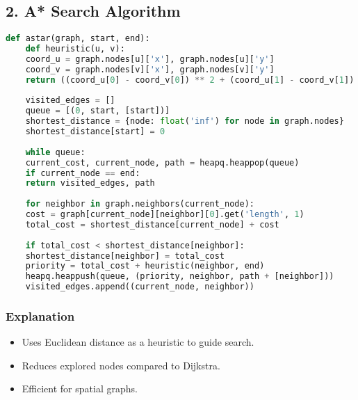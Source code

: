 \subsection*{2. A* Search Algorithm}
\begin{lstlisting}[language=Python, caption=A* Search with Heuristic]
	def astar(graph, start, end):
	def heuristic(u, v):
	coord_u = graph.nodes[u]['x'], graph.nodes[u]['y']
	coord_v = graph.nodes[v]['x'], graph.nodes[v]['y']
	return ((coord_u[0] - coord_v[0]) ** 2 + (coord_u[1] - coord_v[1]) ** 2) ** 0.5
	
	visited_edges = []
	queue = [(0, start, [start])]
	shortest_distance = {node: float('inf') for node in graph.nodes}
	shortest_distance[start] = 0
	
	while queue:
	current_cost, current_node, path = heapq.heappop(queue)
	if current_node == end:
	return visited_edges, path
	
	for neighbor in graph.neighbors(current_node):
	cost = graph[current_node][neighbor][0].get('length', 1)
	total_cost = shortest_distance[current_node] + cost
	
	if total_cost < shortest_distance[neighbor]:
	shortest_distance[neighbor] = total_cost
	priority = total_cost + heuristic(neighbor, end)
	heapq.heappush(queue, (priority, neighbor, path + [neighbor]))
	visited_edges.append((current_node, neighbor))
\end{lstlisting}

\subsubsection*{Explanation}
\begin{itemize}
	\item Uses Euclidean distance as a heuristic to guide search.
	\item Reduces explored nodes compared to Dijkstra.
	\item Efficient for spatial graphs.
\end{itemize}


